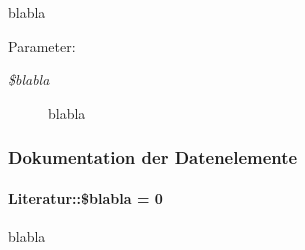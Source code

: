 blabla 

\begin{Desc}
\item[Parameter:]
\begin{description}
\item[{\em \$blabla}]blabla \end{description}
\end{Desc}


\subsubsection{Dokumentation der Datenelemente}
\hypertarget{classLiteratur_1fd31a583c0ffffd05d2ec492a357ec7}{
\paragraph[\$blabla]{\setlength{\rightskip}{0pt plus 5cm}Literatur::\$blabla = 0}\hfill}
\label{classLiteratur_1fd31a583c0ffffd05d2ec492a357ec7}


blabla 

